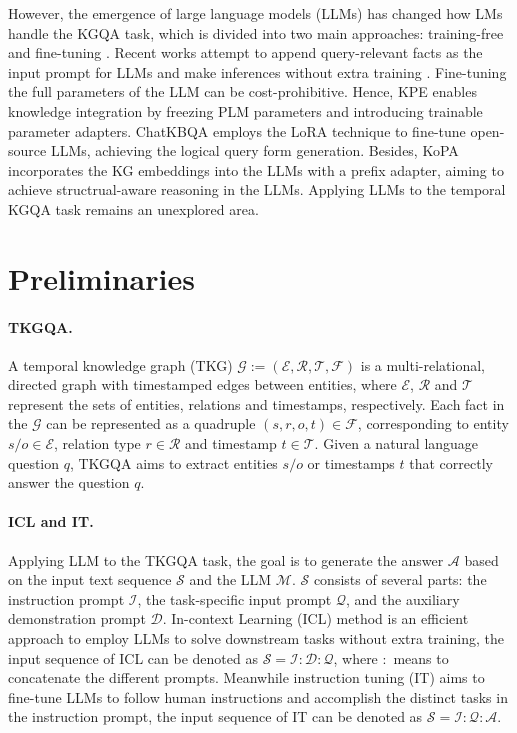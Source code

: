 \documentclass[11pt]{article}
\begin{document}
However, the emergence of large language models (LLMs) has changed how LMs handle the KGQA task, which is divided into two main approaches: training-free and fine-tuning \cite{LLMstudy}.
Recent works attempt to append query-relevant facts as the input prompt for LLMs and make inferences without extra training \cite{zeroshotQA,RRA,structgpt,KG-GPT,COK}. 
Fine-tuning the full parameters of the LLM can be cost-prohibitive.
Hence, KPE \cite{KPE} enables knowledge integration by freezing PLM parameters and introducing trainable parameter adapters.
ChatKBQA \cite{ChatKBQA} employs the LoRA \cite{lora} technique to fine-tune open-source LLMs, achieving the logical query form generation.
Besides, KoPA  \cite{KoPA} incorporates the KG embeddings into the LLMs with a prefix adapter, aiming to achieve structrual-aware reasoning in the LLMs. 
Applying LLMs to the temporal KGQA task remains an unexplored area.







\section{Preliminaries}
\paragraph{TKGQA.}
A temporal knowledge graph (TKG) $\mathcal{G} := (\mathcal{E}, \mathcal{R},\mathcal{T}, \mathcal{F})$ is a multi-relational, directed graph with timestamped edges between entities, where $\mathcal{E}$, $\mathcal{R}$ and $\mathcal{T}$ represent the sets of entities, relations and timestamps, respectively. 
Each fact in the $\mathcal{G}$ can be represented as a quadruple $(s,r,o,t) \in \mathcal{F} $, corresponding to entity $s/o \in \mathcal{E} $, relation type $r \in \mathcal{R}$ and timestamp $t \in \mathcal{T} $. 
Given a natural language question $q$, TKGQA aims to extract entities $s/o$ or timestamps $t$ that correctly answer the question $q$.
\paragraph{ICL and IT.}
Applying LLM to the TKGQA task, the goal is to generate the answer $\mathcal{A}$ based on the input text sequence $\mathcal{S}$ and the LLM $\mathcal{M}$.
$\mathcal{S}$ consists of several parts: the instruction prompt $\mathcal{I}$, the task-specific input prompt $\mathcal{Q}$, and the auxiliary demonstration prompt $\mathcal{D}$.
In-context Learning (ICL) method is an efficient approach to employ LLMs to solve downstream tasks without extra training, the input sequence of ICL can be denoted as $\mathcal{S} = \mathcal{I}:\mathcal{D}:\mathcal{Q}$, where $:$ means to concatenate the different prompts.
Meanwhile instruction tuning (IT) aims to fine-tune LLMs to follow human instructions and accomplish the distinct tasks in the instruction prompt, the input sequence of IT can be denoted as $\mathcal{S} = \mathcal{I}:\mathcal{Q}:\mathcal{A}$. 
\end{document}
